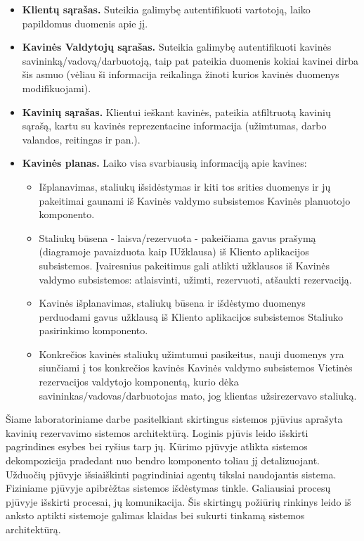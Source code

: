 \documentclass{VUMIFPSkursinis}
\begin{document}
\begin{itemize}
  \item \textbf{Klientų sąrašas.} Suteikia galimybę autentifikuoti vartotoją, laiko papildomus duomenis apie jį.
  \item \textbf{Kavinės Valdytojų sąrašas.} Suteikia galimybę autentifikuoti kavinės savininką/vadovą/darbuotoją, taip pat pateikia duomenis kokiai kavinei dirba šis asmuo (vėliau ši informacija reikalinga žinoti kurios kavinės duomenys modifikuojami).
  \item \textbf{Kavinių sąrašas.} Klientui ieškant kavinės, pateikia atfiltruotą kavinių sąrašą, kartu su kavinės reprezentacine informacija (užimtumas, darbo valandos, reitingas ir pan.).
  \item \textbf{Kavinės planas.} Laiko visa svarbiausią informaciją apie kavines:
  	\begin{itemize}
  	\item Išplanavimas, staliukų išsidėstymas ir kiti tos srities duomenys ir jų pakeitimai gaunami iš Kavinės valdymo subsistemos Kavinės planuotojo komponento.
  	\item Staliukų būsena - laisva/rezervuota - pakeičiama gavus prašymą (diagramoje pavaizduota kaip IUžklausa) iš Kliento aplikacijos subsistemos. Įvairesnius pakeitimus gali atlikti užklausos iš Kavinės valdymo subsistemos: atlaisvinti, užimti, rezervuoti, atšaukti rezervaciją.
  	\item Kavinės išplanavimas, staliukų būsena ir išdėstymo duomenys perduodami gavus užklausą iš Kliento aplikacijos subsistemos Staliuko pasirinkimo komponento.
  	\item Konkrečios kavinės staliukų užimtumui pasikeitus, nauji duomenys yra siunčiami į tos konkrečios kavinės Kavinės valdymo subsistemos Vietinės rezervacijos valdytojo komponentą, kurio dėka savininkas/vadovas/darbuotojas mato, jog klientas užsirezervavo staliuką.
  	\end{itemize}
\end{itemize}


Šiame laboratoriniame darbe pasitelkiant skirtingus sistemos pjūvius aprašyta kavinių rezervavimo sistemos architektūrą. Loginis pjūvis leido išskirti pagrindines esybes bei ryšius tarp jų. Kūrimo pjūvyje atlikta sistemos dekompozicija pradedant nuo bendro komponento toliau jį detalizuojant. Užduočių pjūvyje išsiaiškinti pagrindiniai agentų tikslai naudojantis sistema. Fiziniame pjūvyje apibrėžtas sistemos išdėstymas tinkle.  Galiausiai procesų pjūvyje išskirti procesai, jų komunikacija. Šis skirtingų požiūrių rinkinys leido iš anksto aptikti sistemoje galimas klaidas bei sukurti tinkamą sistemos architektūrą.
\end{document}
